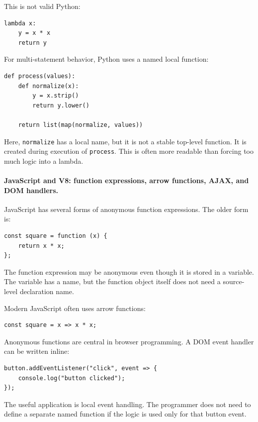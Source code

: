 This is not valid Python:

\begin{verbatim}
lambda x:
    y = x * x
    return y
\end{verbatim}

For multi-statement behavior, Python uses a named local function:

\begin{verbatim}
def process(values):
    def normalize(x):
        y = x.strip()
        return y.lower()

    return list(map(normalize, values))
\end{verbatim}

Here, \texttt{normalize} has a local name, but it is not a stable top-level function. It is created during execution of \texttt{process}. This is often more readable than forcing too much logic into a lambda.

\paragraph{JavaScript and V8: function expressions, arrow functions, AJAX, and DOM handlers.}

JavaScript has several forms of anonymous function expressions. The older form is:

\begin{verbatim}
const square = function (x) {
    return x * x;
};
\end{verbatim}

The function expression may be anonymous even though it is stored in a variable. The variable has a name, but the function object itself does not need a source-level declaration name.

Modern JavaScript often uses arrow functions:

\begin{verbatim}
const square = x => x * x;
\end{verbatim}

Anonymous functions are central in browser programming. A DOM event handler can be written inline:

\begin{verbatim}
button.addEventListener("click", event => {
    console.log("button clicked");
});
\end{verbatim}

The useful application is local event handling. The programmer does not need to define a separate named function if the logic is used only for that button event.

